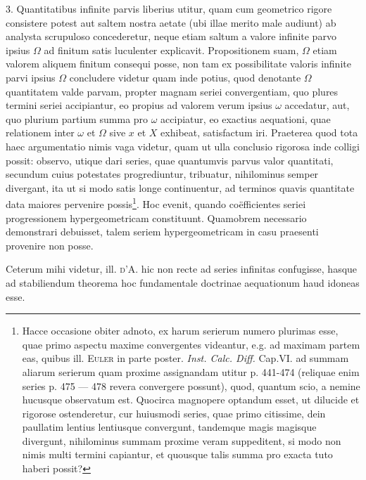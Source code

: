 \documentclass[14pt]{memoir}
\theoremstyle{plain}
\theoremstyle{remark}
\begin{document}
3. Quantitatibus infinite parvis liberius utitur, quam cum geometrico rigore consistere potest aut saltem nostra aetate (ubi illae merito male audiunt) ab analysta scrupuloso concederetur, neque etiam saltum a valore infinite parvo ipsius \(\Omega\) ad finitum satis luculenter explicavit. Propositionem suam, \(\Omega\) etiam valorem aliquem finitum consequi posse, non tam ex possibilitate valoris infinite parvi ipsius \(\Omega\) concludere videtur quam inde potius, quod denotante \(\Omega\) quantitatem valde parvam, propter magnam seriei convergentiam, quo plures termini seriei accipiantur, eo propius ad valorem verum ipsius \(\omega\) accedatur, aut, quo plurium partium summa pro \(\omega\) accipiatur, eo exactius aequationi, quae relationem inter \(\omega\) et \(\Omega\) sive \(x\) et \(X\) exhibeat, satisfactum iri. Praeterea quod tota haec argumentatio nimis vaga videtur, quam ut ulla conclusio rigorosa inde colligi possit: observo, utique dari series, quae quantumvis parvus valor quantitati, secundum cuius potestates progrediuntur, tribuatur, nihilominus semper divergant, ita ut si modo satis longe continuentur, ad terminos quavis quantitate data maiores pervenire possis\footnote{Hacce occasione obiter adnoto, ex harum serierum numero plurimas esse, quae primo aspectu maxime convergentes videantur, e.g. ad maximam partem eas, quibus ill. \textsc{Euler} in parte poster. \textit{Inst. Calc. Diff.} Cap.VI. ad summam aliarum serierum quam proxime assignandam utitur p. 441-474 (reliquae enim series p. 475 — 478 revera convergere possunt), quod, quantum scio, a nemine hucusque observatum est. Quocirca magnopere optandum esset, ut dilucide et rigorose ostenderetur, cur huiusmodi series, quae primo citissime, dein paullatim lentius lentiusque convergunt, tandemque magis magisque divergunt, nihilominus summam proxime veram suppeditent, si modo non nimis multi termini capiantur, et quousque talis summa pro exacta tuto haberi possit?}. Hoc evenit, quando co\"efficientes seriei progressionem hypergeometricam constituunt. Quamobrem necessario demonstrari debuisset, talem seriem hypergeometricam in casu praesenti provenire non posse.

Ceterum mihi videtur, ill. \textsc{d'A.} hic non recte ad series infinitas confugisse, hasque ad stabiliendum theorema hoc fundamentale doctrinae aequationum haud idoneas esse.
\end{document}
